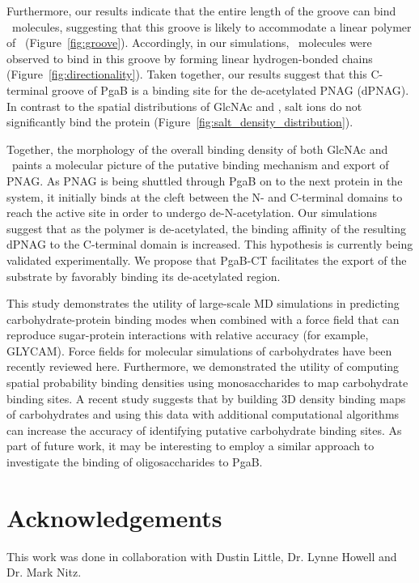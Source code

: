 Furthermore, our results indicate that the entire length of the groove can bind \glucosamine\ molecules, suggesting that this groove is likely to accommodate a linear polymer of \glucosamine\ (Figure~\ref{fig:groove}). Accordingly, in our simulations, \glucosamine\ molecules were observed to bind in this groove by forming linear hydrogen-bonded chains (Figure~\ref{fig:directionality}).  Taken together,  our results suggest that this C-terminal groove of PgaB is a binding site for the de-acetylated PNAG (dPNAG).   In contrast to the spatial distributions of GlcNAc and \glucosamine, salt ions do not significantly bind the protein  (Figure~\ref{fig:salt_density_distribution}). 

Together, the morphology of the overall binding density of both GlcNAc and \glucosamine\ paints a molecular picture of the putative binding mechanism and export of PNAG. As PNAG is being shuttled through PgaB on to the next protein in the system, it initially binds at the cleft between the N- and C-terminal domains to reach the active site in order to undergo de-N-acetylation.  Our simulations suggest that as the polymer is de-acetylated, the binding affinity of the resulting dPNAG to the C-terminal domain is increased. This hypothesis is currently being validated experimentally. We propose that PgaB-CT facilitates the export of  the substrate by favorably binding its de-acetylated region.  






This study demonstrates the utility of large-scale MD simulations in predicting carbohydrate-protein binding modes when combined with a force field that can reproduce sugar-protein interactions with relative accuracy (for example, GLYCAM\cite{Kirschner:2008ii}). Force fields for molecular simulations of carbohydrates have been recently reviewed here.\cite{Fadda:2010p5889}  Furthermore, we demonstrated the utility of computing spatial probability binding densities using monosaccharides to map carbohydrate binding sites. A recent study suggests that by building 3D density binding maps of carbohydrates and using this data with additional computational algorithms can increase the accuracy of identifying putative carbohydrate binding sites.\cite{Tsai:2012bj} As part of future work, it may be interesting to employ a similar approach to investigate the binding of oligosaccharides to PgaB.  





\section{Acknowledgements}
This work was done in collaboration with Dustin Little, Dr. Lynne Howell and Dr. Mark Nitz.

